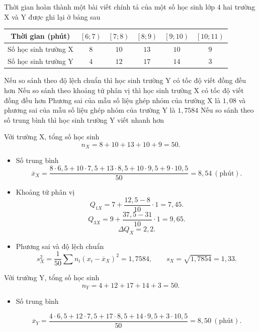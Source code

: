 \begin{ex}%
	Thời gian hoàn thành một bài viết chính tả của một số học sinh lớp $4$ hai trường X và Y được ghi lại ở bảng sau
	\begin{center}
		\begin{tabular}{|c|c|c|c|c|c|}
			\hline
			Thời gian (phút)	& $\left[ 6;7 \right)$ & $\left[ 7;8 \right)$ & $\left[ 8;9 \right)$ & $\left[ 9;10 \right)$ & $\left[ 10;11 \right)$ \\
			\hline
			Số học sinh trường X	& $8$ & $10$ & $13$ & $10$ & $9$ \\
			\hline
			Số học sinh trường Y	& $4$ & $12$ & $17$ & $14$ & $3$ \\
			\hline
		\end{tabular}
	\end{center}
	\choiceTF
	{\True Nếu so sánh theo độ lệch chuẩn thì học sinh trường Y có tốc độ viết đồng đều hơn}
	{Nếu so sánh theo khoảng tứ phân vị thì học sinh trường X có tốc độ viết đồng đều hơn}
	{Phương sai của mẫu số liệu ghép nhóm của trường X là $1{,}08$ và phương sai của mẫu số liệu ghép nhóm của trường Y là $1{,}7584$}
	{\True Nếu so sánh theo số trung bình thì học sinh trường Y viết nhanh hơn}
	\loigiai
	{
		Với trường X, tổng số học sinh
		\[
		n_X = 8+10+13+10+9 = 50.
		\]
		\begin{itemize}
			
			\item {Số trung bình}
			\[
			\overline{x}_X
			= \dfrac{8\cdot6{,}5 + 10\cdot7{,}5 + 13\cdot8{,}5 + 10\cdot9{,}5 + 9\cdot10{,}5}{50}
			= 8{,}54\ (\text{phút}).
			\]
			\item {Khoảng tứ phân vị}
			\[
			Q_{1X} = 7 + \dfrac{12{,}5 - 8}{10}\cdot 1 = 7{,}45.
			\]
			\[
			Q_{3X} = 9 + \dfrac{37{,}5 - 31}{10}\cdot 1 = 9{,}65.
			\]
			\[
			\Delta Q_X = 2{,}2.
			\]
			
			\item {Phương sai và độ lệch chuẩn}
			\[
			s_X^2 = \dfrac{1}{50}\sum n_i(x_i-\overline{x}_X)^2 = 1{,}7584,
			\qquad
			s_X =\sqrt{1{,}7854} = 1{,}33.
			\]
			
		\end{itemize}
		Với trường Y, tổng số học sinh
		\[
		n_Y = 4+12+17+14+3 = 50.
		\]
		\begin{itemize}
			\item {Số trung bình}
			
			\[
			\overline{x}_Y
			= \dfrac{4\cdot6{,}5 + 12\cdot7{,}5 + 17\cdot8{,}5 + 14\cdot9{,}5 + 3\cdot10{,}5}{50}
			= 8{,}50\ (\text{phút}).
			\]
			

\end{itemize}}
\end{ex}
